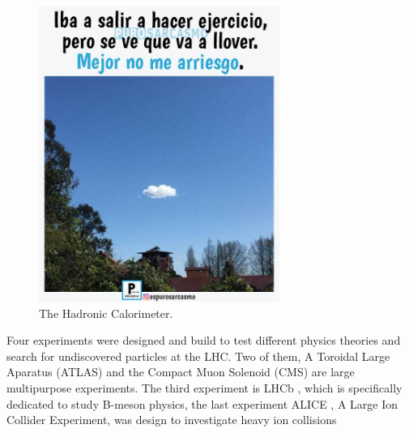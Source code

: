 \begin{figure}[!h]
  \centering
  \includegraphics[width=0.7\textwidth]{../images/ch2/8}
  \caption[The Hadronic Calorimeter]{The Hadronic Calorimeter.}\label{fig:cms_layout}
\end{figure}
Four experiments were designed and build to test different physics theories and search for undiscovered particles at the LHC. Two of them, A Toroidal Large Aparatus (ATLAS)\cite{atlas} and the Compact Muon Solenoid (CMS)\cite{cms_doc} are large multipurpose experiments. The third experiment is LHCb \cite{lhcb}, which is specifically dedicated to study B-meson physics, the last experiment ALICE \cite{alice}, A Large Ion Collider Experiment, was design to investigate heavy ion collisions

